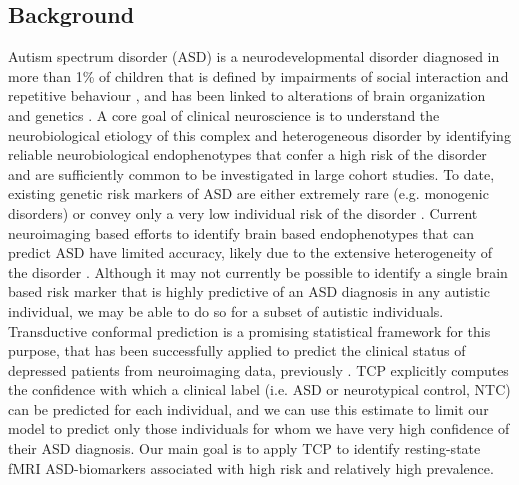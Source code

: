 \documentclass[9pt,lineno]{elife}
\begin{document}
\subsection{Background}
Autism spectrum disorder (ASD) is a neurodevelopmental disorder diagnosed in more than 1\% of children \citep{Bai2019-hb} that is defined by impairments of social interaction and repetitive behaviour \citep{American_Psychiatric_Association2013-ka}, and has been linked to alterations of brain organization \citep{Holiga2019-ub} and genetics \citep{Grove2019-vz}. A core goal of clinical neuroscience is to understand the neurobiological etiology of this complex and heterogeneous disorder \citep{Lombardo2019-mf} by identifying reliable neurobiological endophenotypes that confer a high risk of the disorder and are sufficiently common to be investigated in large cohort studies. To date, existing genetic risk markers of ASD are either extremely rare (e.g. monogenic disorders) or convey only a very low individual risk of the disorder \citep[e.g. common genetic risk factors, ][]{Sanders2015-ef,De_la_Torre-Ubieta2016-fw}. Current neuroimaging based efforts to identify brain based endophenotypes that can predict ASD \citep{Abraham2017-vf,Heinsfeld2018-yl} have limited accuracy, likely due to the extensive heterogeneity of the disorder \citep[][see also ]{Lombardo2019-mf,Jacob2019-zf}. Although it may not currently be possible to identify a single brain based risk marker that is highly predictive of an ASD diagnosis in any autistic individual, we may be able to do so for a subset of autistic individuals. Transductive conformal prediction \citep[TCP, ][]{Vapnik1998-vb,Vovk2005-uc} is a promising statistical framework  for this purpose, that has been successfully applied to predict the clinical status of depressed patients from neuroimaging data, previously \citep{Nouretdinov2011-ph}. TCP explicitly computes the confidence with which a clinical label (i.e. ASD or neurotypical control, NTC) can be predicted for each individual, and we can use this estimate to limit our model to predict only those individuals for whom we have very high confidence of their ASD diagnosis. Our main goal is to apply TCP to identify resting-state fMRI ASD-biomarkers associated with high risk and relatively high prevalence.
\end{document}
